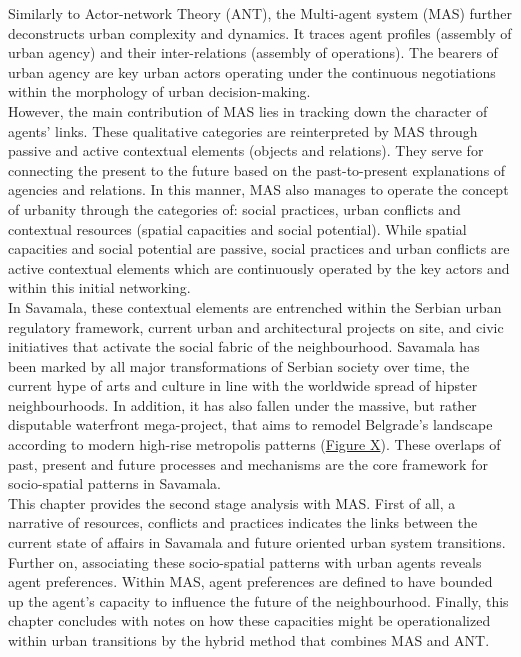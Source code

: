 \documentclass[11pt]{report}
\begin{document}
Similarly to Actor-network Theory (ANT), the Multi-agent system (MAS) further deconstructs urban complexity and dynamics. It traces agent profiles (assembly of urban agency) and their inter-relations (assembly of operations). The bearers of urban agency are key urban actors operating under the continuous negotiations within the morphology of urban decision-making.
\\

However, the main contribution of MAS lies in tracking down the character of agents’ links. These qualitative categories are reinterpreted by MAS through passive and active contextual elements (objects and relations). They serve for connecting the present to the future based on the past-to-present explanations of agencies and relations. In this manner, MAS also manages to operate the concept of urbanity through the categories of: social practices, urban conflicts and contextual resources (spatial capacities and social potential). While spatial capacities and social potential are passive, social practices and urban conflicts are active contextual elements which are continuously operated by the key actors and within this initial networking.
\\

In Savamala, these contextual elements are entrenched within the Serbian urban regulatory framework, current urban and architectural projects on site, and civic initiatives that activate the social fabric of the neighbourhood. Savamala has been marked by all major transformations of Serbian society over time, the current hype of arts and culture in line with the worldwide spread of hipster neighbourhoods. In addition, it has also fallen under the massive, but rather disputable waterfront mega-project, that aims to remodel Belgrade’s landscape according to modern high-rise metropolis patterns (\href{Figure Belgrade and Savamala}{Figure X}). %
These overlaps of past, present and future processes and mechanisms are the core framework for socio-spatial patterns in Savamala.
\\

This chapter provides the second stage analysis with MAS. First of all, a narrative of resources, conflicts and practices indicates the links between the current state of affairs in Savamala and future oriented urban system transitions. Further on, associating these socio-spatial patterns with urban agents reveals agent preferences. Within MAS, agent preferences are defined to have bounded up the agent’s capacity to influence the future of the neighbourhood. Finally, this chapter concludes with notes on how these capacities might be operationalized within urban transitions by the hybrid method that combines MAS and ANT.
\end{document}
